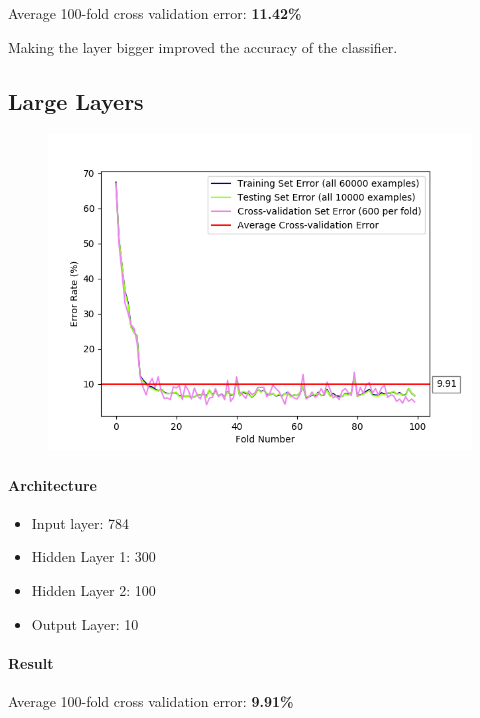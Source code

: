 \documentclass[11pt]{article}
\makeatletter
\def\maxwidth{\ifdim\Gin@nat@width>\linewidth\linewidth
    \else\Gin@nat@width\fi}
\let\Oldincludegraphics\includegraphics
\renewcommand{\includegraphics}[1]{\Oldincludegraphics[width=.8\maxwidth]{#1}}
\providecommand{\tightlist}{%
      \setlength{\itemsep}{0pt}\setlength{\parskip}{0pt}}
\makeatother
\begin{document}
Average 100-fold cross validation error: \textbf{11.42\%}

Making the layer bigger improved the accuracy of the classifier.

\pagebreak

\subsection{Large Layers}\label{large-layers}

\begin{figure}[htbp]
\centering
\includegraphics{plots/ff-layersize-300-100.png}
\end{figure}

\paragraph{Architecture}\label{architecture-2}

\begin{itemize}
\tightlist
\item
  Input layer: 784
\item
  Hidden Layer 1: 300
\item
  Hidden Layer 2: 100
\item
  Output Layer: 10
\end{itemize}

\paragraph{Result}\label{result-2}

Average 100-fold cross validation error: \textbf{9.91\%}
\end{document}
